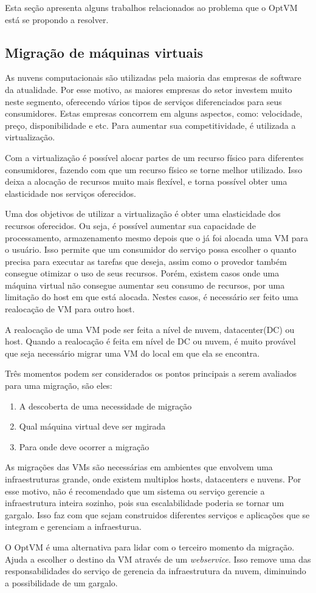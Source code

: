 Esta seção apresenta alguns trabalhos relacionados ao problema que o OptVM está
se propondo a resolver.

\subsection{Migração de máquinas virtuais}
As nuvens computacionais são utilizadas pela maioria das empresas de software da atualidade. 
Por esse motivo, as maiores empresas do setor investem muito neste segmento, 
oferecendo vários tipos de serviços diferenciados para seus consumidores. 
Estas empresas concorrem em alguns aspectos, como: velocidade, preço, disponibilidade e etc. 
Para aumentar sua competitividade, é utilizada a virtualização.

Com a virtualização é possível alocar partes de um recurso físico para diferentes consumidores, 
fazendo com que um recurso físico se torne melhor utilizado. Isso deixa a alocação de recursos
muito mais flexível, e torna possível obter uma elasticidade nos serviços oferecidos. 

Uma dos objetivos de utilizar a virtualização é obter uma elasticidade dos recursos oferecidos.
Ou seja, é possível aumentar sua capacidade de processamento, armazenamento mesmo depois que o
já foi alocada uma VM para o usuário.
Isso permite que um consumidor do  serviço possa escolher o quanto precisa para executar as 
tarefas que deseja, assim como o provedor também consegue otimizar o uso de seus recursos. Porém,
existem casos onde uma máquina virtual não consegue aumentar seu consumo de recursos, por uma limitação
do host em que está alocada. Nestes casos, é necessário ser feito uma realocação de VM para outro 
host.

A realocação de uma VM pode ser feita a nível de nuvem, datacenter(DC) ou host.
Quando a realocação é feita em nível de DC ou nuvem, é muito provável que seja 
necessário migrar uma VM do local em que ela se encontra. 

Três momentos podem ser considerados os pontos principais a serem avaliados para uma migração, 
são eles:

\begin{enumerate}
\item A descoberta de uma necessidade de migração
\item Qual máquina virtual deve ser mgirada
\item Para onde deve ocorrer a migração
\end{enumerate}

As migrações das VMs são necessárias em ambientes que envolvem uma infraestruturas
grande, onde existem multiplos hosts, datacenters e nuvens. Por esse motivo, não é recomendado que 
um sistema ou serviço gerencie a infraestrutura inteira sozinho, pois sua escalabilidade 
poderia se tornar um gargalo. Isso faz com que sejam construidos diferentes serviços e aplicações 
que se integram e gerenciam a infraesturua.

O OptVM é uma alternativa para lidar com o terceiro momento da migração. 
Ajuda a escolher o destino da VM através de um \textit{webservice}. Isso 
remove uma das responsabilidades do serviço de gerencia da infraestrutura da
nuvem, diminuindo a possibilidade de um gargalo.

